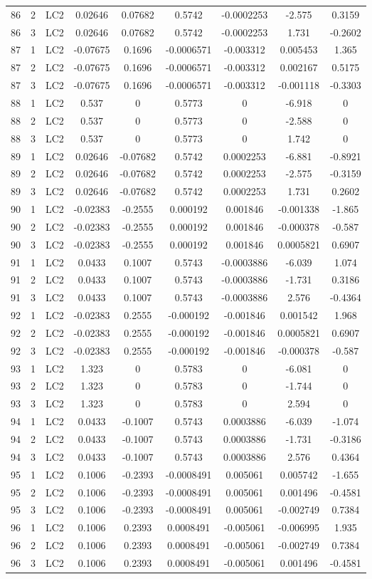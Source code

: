 \documentclass{article}%
\begin{document}
\begin{longtable}{| c c c | c c c c c c |}
86&2&LC2&0.02646&0.07682&0.5742&{-}0.0002253&{-}2.575&0.3159\\%
86&3&LC2&0.02646&0.07682&0.5742&{-}0.0002253&1.731&{-}0.2602\\%
87&1&LC2&{-}0.07675&0.1696&{-}0.0006571&{-}0.003312&0.005453&1.365\\%
87&2&LC2&{-}0.07675&0.1696&{-}0.0006571&{-}0.003312&0.002167&0.5175\\%
87&3&LC2&{-}0.07675&0.1696&{-}0.0006571&{-}0.003312&{-}0.001118&{-}0.3303\\%
88&1&LC2&0.537&0&0.5773&0&{-}6.918&0\\%
88&2&LC2&0.537&0&0.5773&0&{-}2.588&0\\%
88&3&LC2&0.537&0&0.5773&0&1.742&0\\%
89&1&LC2&0.02646&{-}0.07682&0.5742&0.0002253&{-}6.881&{-}0.8921\\%
89&2&LC2&0.02646&{-}0.07682&0.5742&0.0002253&{-}2.575&{-}0.3159\\%
89&3&LC2&0.02646&{-}0.07682&0.5742&0.0002253&1.731&0.2602\\%
90&1&LC2&{-}0.02383&{-}0.2555&0.000192&0.001846&{-}0.001338&{-}1.865\\%
90&2&LC2&{-}0.02383&{-}0.2555&0.000192&0.001846&{-}0.000378&{-}0.587\\%
90&3&LC2&{-}0.02383&{-}0.2555&0.000192&0.001846&0.0005821&0.6907\\%
91&1&LC2&0.0433&0.1007&0.5743&{-}0.0003886&{-}6.039&1.074\\%
91&2&LC2&0.0433&0.1007&0.5743&{-}0.0003886&{-}1.731&0.3186\\%
91&3&LC2&0.0433&0.1007&0.5743&{-}0.0003886&2.576&{-}0.4364\\%
92&1&LC2&{-}0.02383&0.2555&{-}0.000192&{-}0.001846&0.001542&1.968\\%
92&2&LC2&{-}0.02383&0.2555&{-}0.000192&{-}0.001846&0.0005821&0.6907\\%
92&3&LC2&{-}0.02383&0.2555&{-}0.000192&{-}0.001846&{-}0.000378&{-}0.587\\%
93&1&LC2&1.323&0&0.5783&0&{-}6.081&0\\%
93&2&LC2&1.323&0&0.5783&0&{-}1.744&0\\%
93&3&LC2&1.323&0&0.5783&0&2.594&0\\%
94&1&LC2&0.0433&{-}0.1007&0.5743&0.0003886&{-}6.039&{-}1.074\\%
94&2&LC2&0.0433&{-}0.1007&0.5743&0.0003886&{-}1.731&{-}0.3186\\%
94&3&LC2&0.0433&{-}0.1007&0.5743&0.0003886&2.576&0.4364\\%
95&1&LC2&0.1006&{-}0.2393&{-}0.0008491&0.005061&0.005742&{-}1.655\\%
95&2&LC2&0.1006&{-}0.2393&{-}0.0008491&0.005061&0.001496&{-}0.4581\\%
95&3&LC2&0.1006&{-}0.2393&{-}0.0008491&0.005061&{-}0.002749&0.7384\\%
96&1&LC2&0.1006&0.2393&0.0008491&{-}0.005061&{-}0.006995&1.935\\%
96&2&LC2&0.1006&0.2393&0.0008491&{-}0.005061&{-}0.002749&0.7384\\%
96&3&LC2&0.1006&0.2393&0.0008491&{-}0.005061&0.001496&{-}0.4581\\%
\end{longtable}%
\end{document}
